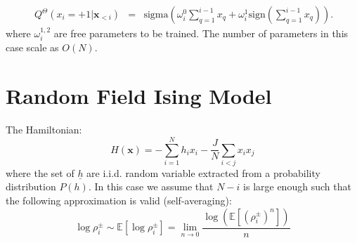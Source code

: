 \documentclass{article}
\begin{document}
\begin{eqnarray}\
\label{eq:curie_weiss_cond2}
Q^{\Theta}\left(x_{i}=+1|\mathbf{x}_{<i}\right) & = & \text{sigma}\left(\omega_{i}^0\sum_{q=1}^{i-1}x_{q} + \omega_i^1 \text{sign}(\sum_{q=1}^{i-1}x_{q})\right).
\end{eqnarray}
where $\omega_i^{1,2}$ are free parameters to be trained. The number of parameters in this case scale as $O(N)$.



\section{Random Field Ising Model}
The Hamiltonian:
\begin{equation}
H\left(\mathbf{x}\right)=-\sum_{i=1}^{N}h_ix_{i}-\frac{J}{N}\sum_{i<j}x_{i}x_{j}
\end{equation}
where the set of $\underline{h}$ are i.i.d. random variable extracted from a probability distribution $P(h)$. In this case 
we assume that $N-i$ is large enough such that the following approximation is valid (self-averaging): 
\[
\log\rho_i^{\pm} \sim \mathbb{E}\left[  \log\rho_i^{\pm} \right] = \lim_{n\rightarrow 0} \frac{  \log(\mathbb{E}\left[(\rho_i^{\pm})^n \right])}{n}
\]
\end{document}
